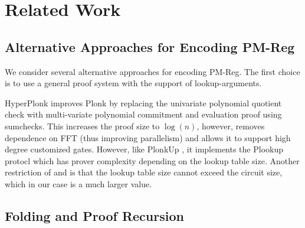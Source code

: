 \section{Related Work}
\subsection{Alternative Approaches for Encoding PM-Reg}
We consider several alternative approaches for encoding
PM-Reg. The first choice is to use a general proof system
with the support of lookup-arguments.

HyperPlonk \cite{HyperPlonk} improves Plonk by replacing
the univariate polynomial quotient check with multi-variate
polynomial commitment and evaluation proof using sumchecks.
This increases the proof size to $\log(n)$, however,
removes dependence on FFT (thus improving parallelism)
and allows it to support high degree customized gates.
However, like PlonkUp \cite{PlonkUp}, it implements the
Plookup protocl \cite{plookup} which has prover
complexity depending on the lookup table size.
Another restriction of \cite{plookup} and \cite{PlonkUp}
is that the lookup table size cannot exceed
the circuit size, which in our case is a much larger value.

\subsection{Folding and Proof Recursion}

